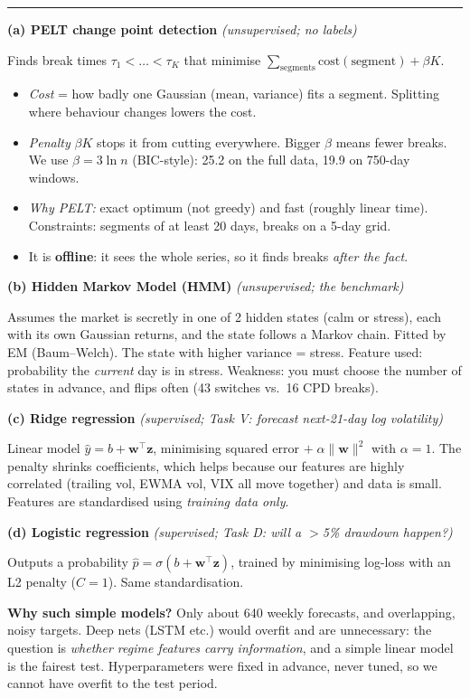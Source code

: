 \documentclass[10pt]{article}
\newcommand{\h}[1]{\vspace{4pt}{\large\bfseries #1}\par\vspace{1pt}\hrule\vspace{3pt}}
\begin{document}
\h{4. What each model is and does}
\textbf{(a) PELT change point detection} \emph{(unsupervised; no labels)}\par
Finds break times $\tau_1<\dots<\tau_K$ that minimise \;$\sum_{\text{segments}}\text{cost}(\text{segment})+\beta K$.
\begin{itemize}
\item \emph{Cost} = how badly one Gaussian (mean, variance) fits a segment. Splitting where behaviour changes lowers the cost.
\item \emph{Penalty} $\beta K$ stops it from cutting everywhere. Bigger $\beta$ means fewer breaks. We use $\beta=3\ln n$ (BIC-style): 25.2 on the full data, 19.9 on 750-day windows.
\item \emph{Why PELT:} exact optimum (not greedy) and fast (roughly linear time). Constraints: segments of at least 20 days, breaks on a 5-day grid.
\item It is \textbf{offline}: it sees the whole series, so it finds breaks \emph{after the fact}.
\end{itemize}
\textbf{(b) Hidden Markov Model (HMM)} \emph{(unsupervised; the benchmark)}\par
Assumes the market is secretly in one of 2 hidden states (calm or stress), each with its own Gaussian returns, and the state follows a Markov chain. Fitted by EM (Baum--Welch). The state with higher variance = stress. Feature used: probability the \emph{current} day is in stress. Weakness: you must choose the number of states in advance, and flips often (43 switches vs.\ 16 CPD breaks).

\textbf{(c) Ridge regression} \emph{(supervised; Task V: forecast next-21-day log volatility)}\par
Linear model $\hat y=b+\mathbf w^\top\mathbf z$, minimising squared error $+\;\alpha\|\mathbf w\|^2$ with $\alpha=1$. The penalty shrinks coefficients, which helps because our features are highly correlated (trailing vol, EWMA vol, VIX all move together) and data is small. Features are standardised using \emph{training data only}.

\textbf{(d) Logistic regression} \emph{(supervised; Task D: will a $>$5\% drawdown happen?)}\par
Outputs a probability $\hat p=\sigma(b+\mathbf w^\top\mathbf z)$, trained by minimising log-loss with an L2 penalty ($C=1$). Same standardisation.

\textbf{Why such simple models?} Only about 640 weekly forecasts, and overlapping, noisy targets. Deep nets (LSTM etc.) would overfit and are unnecessary: the question is \emph{whether regime features carry information}, and a simple linear model is the fairest test. Hyperparameters were fixed in advance, never tuned, so we cannot have overfit to the test period.
\end{document}
